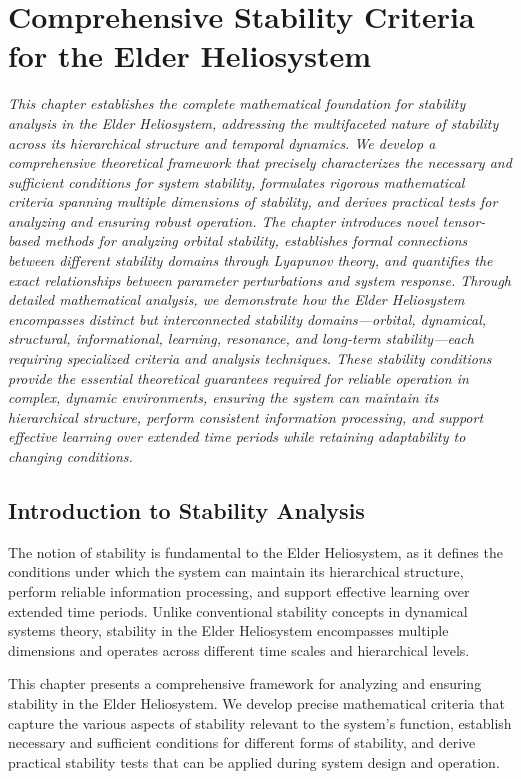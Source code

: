 \chapter{Comprehensive Stability Criteria for the Elder Heliosystem}

\textit{This chapter establishes the complete mathematical foundation for stability analysis in the Elder Heliosystem, addressing the multifaceted nature of stability across its hierarchical structure and temporal dynamics. We develop a comprehensive theoretical framework that precisely characterizes the necessary and sufficient conditions for system stability, formulates rigorous mathematical criteria spanning multiple dimensions of stability, and derives practical tests for analyzing and ensuring robust operation. The chapter introduces novel tensor-based methods for analyzing orbital stability, establishes formal connections between different stability domains through Lyapunov theory, and quantifies the exact relationships between parameter perturbations and system response. Through detailed mathematical analysis, we demonstrate how the Elder Heliosystem encompasses distinct but interconnected stability domains—orbital, dynamical, structural, informational, learning, resonance, and long-term stability—each requiring specialized criteria and analysis techniques. These stability conditions provide the essential theoretical guarantees required for reliable operation in complex, dynamic environments, ensuring the system can maintain its hierarchical structure, perform consistent information processing, and support effective learning over extended time periods while retaining adaptability to changing conditions.}

\section{Introduction to Stability Analysis}

The notion of stability is fundamental to the Elder Heliosystem, as it defines the conditions under which the system can maintain its hierarchical structure, perform reliable information processing, and support effective learning over extended time periods. Unlike conventional stability concepts in dynamical systems theory, stability in the Elder Heliosystem encompasses multiple dimensions and operates across different time scales and hierarchical levels.

This chapter presents a comprehensive framework for analyzing and ensuring stability in the Elder Heliosystem. We develop precise mathematical criteria that capture the various aspects of stability relevant to the system's function, establish necessary and sufficient conditions for different forms of stability, and derive practical stability tests that can be applied during system design and operation.

